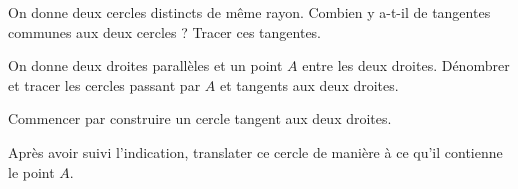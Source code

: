 \begin{exo}
On donne deux cercles distincts de même rayon. Combien y a-t-il de tangentes communes aux deux cercles ? Tracer ces tangentes.
\end{exo}


\begin{exo}
On donne deux droites parallèles et un point $A$ entre les deux droites. Dénombrer et tracer les cercles passant par $A$ et tangents aux deux droites. %

\begin{hint}
Commencer par construire un cercle tangent aux deux droites.
\end{hint}
\begin{sol}
Après avoir suivi l'indication, translater ce cercle de manière à ce qu'il contienne le point $A$.
\end{sol}
\end{exo}



